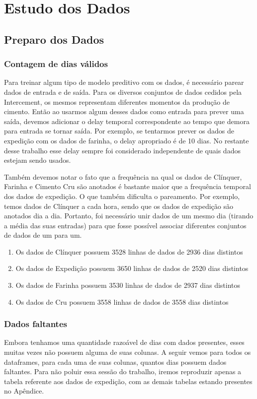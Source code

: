 \chapter{Estudo dos Dados}
\label{cap:estudodados}


\section{Preparo dos Dados}

\subsection{Contagem de dias válidos}

Para treinar algum tipo de modelo preditivo com os dados, é necessário parear dados de entrada e de saída. Para os diversos conjuntos de dados cedidos pela Intercement, os mesmos representam diferentes momentos da produção de cimento. Então ao usarmos algum desses dados como entrada para prever uma saída, devemos adicionar o delay temporal correspondente ao tempo que demora para entrada se tornar saída. Por exemplo, se tentarmos prever os dados de expedição com os dados de farinha, o delay apropriado é de 10 dias. No restante desse trabalho esse delay sempre foi considerado independente de quais dados estejam sendo usados.

Também devemos notar o fato que a frequência na qual os dados de Clínquer, Farinha e Cimento Cru são anotados é bastante maior que a frequência temporal dos dados de expedição. O que também dificulta o pareamento. Por exemplo, temos dados de Clínquer a cada hora, sendo que os dados de expedição são anotados dia a dia. Portanto, foi necessário unir dados de um mesmo dia (tirando a média das suas entradas) para que fosse possível associar diferentes conjuntos de dados de um para um.
\begin{enumerate}
    \item Os dados de  Clínquer possuem 3528 linhas de dados de 2936 dias distintos
\item Os dados de  Expedição possuem 3650 linhas de dados de 2520 dias distintos
\item Os dados de  Farinha possuem 3530 linhas de dados de 2937 dias distintos
\item Os dados de  Cru possuem 3558 linhas de dados de 3558 dias distintos
\end{enumerate}

\subsection{Dados faltantes}
Embora tenhamos uma quantidade razoável de dias com dados presentes, esses muitas vezes não possuem alguma de suas colunas.
A seguir vemos para todos os dataframes, para cada uma de suas colunas, quantos
dias possuem dados faltantes. Para não poluir essa sessão do trabalho, iremos
reproduzir apenas a tabela referente aos dados de expedição, com as demais
tabelas estando presentes no Apêndice. \\

